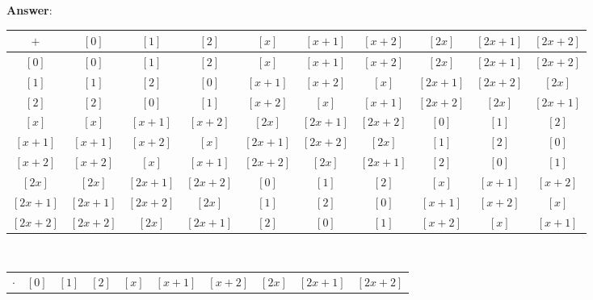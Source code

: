 \documentclass{article}
\begin{document}
\begin{enumerate}
\begin{enumerate}
                        \textbf{Answer}:
                        \begin{adjustwidth}{-1in}{-1in}
                              \begin{center}
                                    \begin{tabular}{c|c c c c c c c c c}
                                          $+$      & $[0]$    & $[1]$    & $[2]$    & $[x]$    & $[x+1]$  & $[x+2]$  & $[2x]$   & $[2x+1]$ & $[2x+2]$ \\
                                          \hline
                                          $[0]$    & $[0]$    & $[1]$    & $[2]$    & $[x]$    & $[x+1]$  & $[x+2]$  & $[2x]$   & $[2x+1]$ & $[2x+2]$ \\
                                          $[1]$    & $[1]$    & $[2]$    & $[0]$    & $[x+1]$  & $[x+2]$  & $[x]$    & $[2x+1]$ & $[2x+2]$ & $[2x]$   \\
                                          $[2]$    & $[2]$    & $[0]$    & $[1]$    & $[x+2]$  & $[x]$    & $[x+1]$  & $[2x+2]$ & $[2x]$   & $[2x+1]$ \\
                                          $[x]$    & $[x]$    & $[x+1]$  & $[x+2]$  & $[2x]$   & $[2x+1]$ & $[2x+2]$ & $[0]$    & $[1]$    & $[2]$    \\
                                          $[x+1]$  & $[x+1]$  & $[x+2]$  & $[x]$    & $[2x+1]$ & $[2x+2]$ & $[2x]$   & $[1]$    & $[2]$    & $[0]$    \\
                                          $[x+2]$  & $[x+2]$  & $[x]$    & $[x+1]$  & $[2x+2]$ & $[2x]$   & $[2x+1]$ & $[2]$    & $[0]$    & $[1]$    \\
                                          $[2x]$   & $[2x]$   & $[2x+1]$ & $[2x+2]$ & $[0]$    & $[1]$    & $[2]$    & $[x]$    & $[x+1]$  & $[x+2]$  \\
                                          $[2x+1]$ & $[2x+1]$ & $[2x+2]$ & $[2x]$   & $[1]$    & $[2]$    & $[0]$    & $[x+1]$  & $[x+2]$  & $[x]$    \\
                                          $[2x+2]$ & $[2x+2]$ & $[2x]$   & $[2x+1]$ & $[2]$    & $[0]$    & $[1]$    & $[x+2]$  & $[x]$    & $[x+1]$
                                    \end{tabular}\\
                                    \begin{tabular}{c|c c c c c c c c c}
                                          $\cdot$  & $[0]$ & $[1]$    & $[2]$    & $[x]$    & $[x+1]$  & $[x+2]$  & $[2x]$   & $[2x+1]$ & $[2x+2]$ \\

\end{tabular}
\end{center}
\end{adjustwidth}
\end{enumerate}
\end{enumerate}
\end{document}
